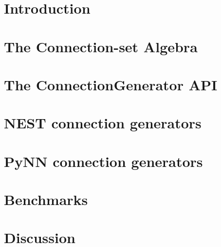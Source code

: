 \documentclass[a4paper]{article}
\begin{document}
\section{Introduction}






\section{The Connection-set Algebra}




\section{The ConnectionGenerator API}



\section{NEST connection generators}


\section{PyNN connection generators}


\section{Benchmarks}


\section{Discussion}



\end{document}
